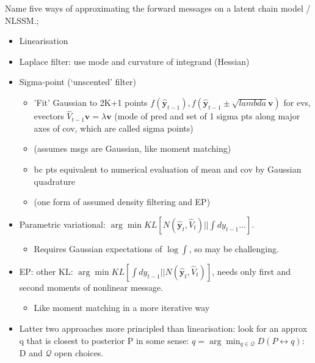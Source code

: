 \documentclass{article}
\begin{document}
Name five ways of approximating the forward messages on a latent chain model / NLSSM.; \begin{itemize}
    \item Linearisation
    \item Laplace filter: use mode and curvature of integrand (Hessian)
    \item Sigma-point (`unscented' filter) \begin{itemize}
        \item 'Fit' Gaussian to 2K+1 points $f(\hat{\mathbf{y}}_{t-1}), f(\hat{\mathbf{y}}_{t-1}\pm \sqrt{lambda}\mathbf{v})$ for evs, evectors $\hat{V}_{t-1}\mathbf{v}=\lambda\mathbf{v}$ (mode of pred and set of 1 sigma pts along major axes of cov, which are called sigma points)
        \item (assumes msgs are Gaussian, like moment matching)
        \item bc pts equivalent to numerical evaluation of mean and cov by Gaussian quadrature
        \item (one form of assumed density filtering and EP)
    \end{itemize}
    \item Parametric variational: $\arg\min KL [N(\mathbf{\hat{y}}_t, \hat{V}_t)||\int dy_{t-1}...]$. \begin{itemize}
        \item Requires Gaussian expectations of $\log \int$, so may be challenging.
    \end{itemize}
    \item EP: other KL: $\arg\min KL[\int  dy_{t-1} ||N(\hat{\mathbf{y}}_t, \hat{V}_t)]$, needs only first and second moments of nonlinear message.
    \begin{itemize}
        \item Like moment matching in a more iterative way
    \end{itemize}
    \item Latter two approaches more principled than linearisation: look for an approx q that is closest to posterior P in some sense: $q=\arg\min_{q\in\mathcal{Q}}D(P\leftrightarrow q)$: D and $\mathcal{Q}$ open choices.
\end{itemize}
\end{document}
